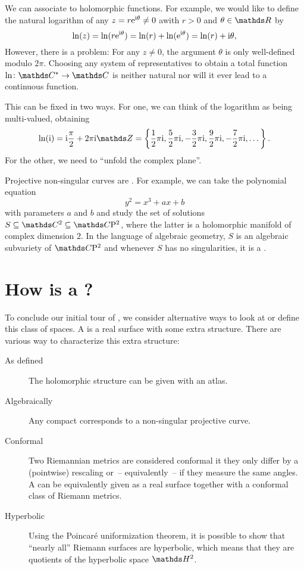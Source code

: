 \begin{bsp}
	We can associate \RSs to holomorphic functions.
	For example,
	we would like to define the natural logarithm
	of any \(z = r\mathrm{e}^{\mathrm{i}\theta} \neq 0\)
	awith \(r > 0\) and \(\theta \in \R\) by
	\[
		\ln(z)
		= \ln(r\mathrm{e}^{\mathrm{i}\theta})
		= \ln(r) + \ln(\mathrm{e}^{\mathrm{i}\theta})
		= \ln(r) + \mathrm{i}\theta,
	\]
	However, there is a problem:
	For any \(z \neq 0\),
	the argument \(\theta\) is only well-defined modulo \(2\pi\).
	Choosing any system of representatives
	to obtain a total function \(\ln\colon \C^* \to \C\)
	is neither natural nor will it ever lead to a continuous function.

	This can be fixed in two ways.
	For one, we can think of the logarithm as being multi-valued,
	obtaining
	\[
		\ln(\i)
		= \i\frac\pi2+2\pi\i\Z
		= \left\{
			\frac12\pi\i, \frac52\pi\i,
			-\frac32\pi\i, \frac92\pi\i,
			-\frac72\pi\i, \dots
		\right\}.
	\]
	For the other,
	we need \RSs to “unfold the complex plane”.
\end{bsp}

\begin{bsp}
	Projective non-singular curves are \RSs.
	For example, we can take the polynomial equation
	\[y^2 = x^3+ax+b\]
	with parameters \(a\) and \(b\)
	and study the set of solutions \(S \subseteq \C^2 \subseteq \Proj\C2\),
	where the latter is a holomorphic manifold of complex dimension \(2\).
	In the language of algebraic geometry,
	\(S\) is an algebraic subvariety of \(\Proj\C2\)
	and whenever \(S\) has no singularities,
	it is a \RS.
\end{bsp}

\section{How is a \RS?}

To conclude our initial tour of \RSs,
we consider alternative ways
to look at or define this class of spaces.
A \RS is a real surface with some extra structure.
There are various way to characterize this extra structure:
\begin{description}
\item[As defined] The holomorphic structure can be given with an atlas.
\item[Algebraically] Any compact \RS
	corresponds to a non-singular projective curve.
\item[Conformal] Two Riemannian metrics are considered conformal
	it they only differ by a (pointwise) rescaling
	or~-- equivalently~-- if they measure the same angles.
	A \RS can be equivalently given
	as a real surface together with a conformal class of Riemann metrics.
\item[Hyperbolic] Using the Poincaré uniformization theorem,
	it is possible to show
	that “nearly all” Riemann surfaces are hyperbolic,
	which means that they are quotients of the hyperbolic space \(\H^2\).
\end{description}
